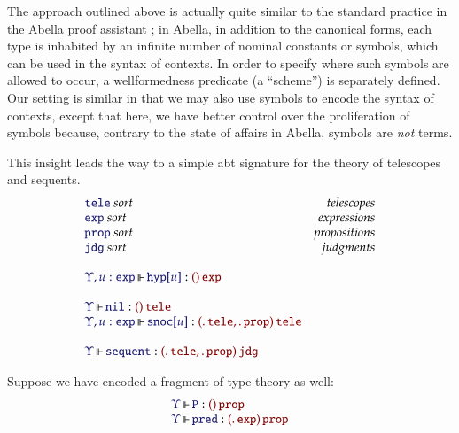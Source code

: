 \documentclass[11pt]{article}
\theoremstyle{definition}
\theoremstyle{remark}
\numberwithin{equation}{section}
\newcommand\SortExp{\mathtt{exp}}
\begin{document}
The approach outlined above is actually quite similar to the standard practice
in the Abella proof assistant \cite{gacek:2008}; in Abella, in addition to the
canonical forms, each type is inhabited by an infinite number of nominal
constants or symbols, which can be used in the syntax of contexts. In order to
specify where such symbols are allowed to occur, a wellformedness predicate (a
``scheme'') is separately defined. Our setting is similar in that we may also
use symbols to encode the syntax of contexts, except that here, we have better
control over the proliferation of symbols because, contrary to the state of
affairs in Abella, symbols are \emph{not} terms.

This insight leads the way to a simple abt signature for the theory of
telescopes and sequents.
%
\newcommand\SortTele{\mathtt{tele}}
\newcommand\SortJdg{\mathtt{jdg}}
\newcommand\SortProp{\mathtt{prop}}
\newcommand\SortExpr{\mathtt{exp}}
\newcommand\OpNil{\mathtt{nil}}
\newcommand\OpSnoc[1]{\mathtt{snoc}[#1]}
\newcommand\OpHyp[1]{\mathtt{hyp}[#1]}
\newcommand\OpSequent{\mathtt{sequent}}
\[
  \begin{array}{lr}
    \IsSort{\SortTele}&\textit{telescopes}\\
    \IsSort{\SortExpr}&\textit{expressions}\\
    \IsSort{\SortProp}&\textit{propositions}\\
    \IsSort{\SortJdg}&\textit{judgments}\\\\
    \IsOperator{\Upsilon, u:\SortExpr}{\OpHyp{u}}{
      \MkArity{}{\SortExpr}
    }\\\\
    \IsOperator{\Upsilon}{\OpNil}{
      \MkArity{}{\SortTele}
    }\\
    \IsOperator{\Upsilon, u:\SortExpr}{\OpSnoc{u}}{
      \MkArity{
        \MkValence{}{}{\SortTele},
        \MkValence{}{}{\SortProp}
      }{\SortTele}
    }\\\\
    \IsOperator{\Upsilon}{\OpSequent}{
      \MkArity{
        \MkValence{}{}{\SortTele},
        \MkValence{}{}{\SortProp}
      }{\SortJdg}
    }
  \end{array}
\]

Suppose we have encoded a fragment of type theory as well:
\[
  \begin{array}{l}
    \IsOperator{\Upsilon}{\mathtt{P}}{
      \MkArity{}{\SortProp}
    }
\\
    \IsOperator{\Upsilon}{\mathtt{pred}}{
      \MkArity{
        \MkValence{}{}{\SortExp}
      }{\SortProp}
    }
\\
  \end{array}
\]
\end{document}
